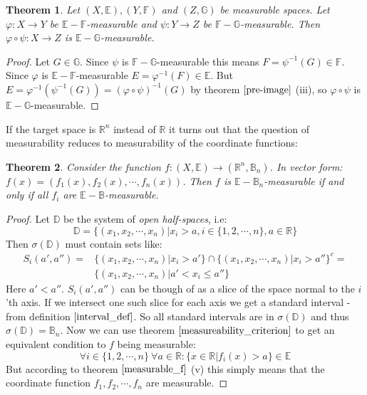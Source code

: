\documentclass[12pt, a4paper]{article}
\newtheorem{theorem}{Theorem}[section]
\numberwithin{equation}{section}
\begin{document}
\begin{theorem}
\label{composite_measurable}
Let $(X,\mathbb{E}), (Y,\mathbb{F})$ and $(Z,\mathbb{G})$ be measurable spaces. Let $\varphi: X\rightarrow Y$ be $\mathbb{E}-\mathbb{F}$-measurable and $\psi: Y\rightarrow Z$ be $\mathbb{F}-\mathbb{G}$-measurable. Then $\varphi\circ\psi: X\rightarrow Z$ is $\mathbb{E}-\mathbb{G}$-measurable.
\end{theorem}
\begin{proof}
Let $G\in\mathbb{G}$. Since $\psi$ is $\mathbb{F}-\mathbb{G}$-measurable this means $F=\psi^{-1}(G)\in\mathbb{F}$. Since $\varphi$ is $\mathbb{E}-\mathbb{F}$-measurable $E=\varphi^{-1}(F)\in\mathbb{E}$. But $E=\varphi^{-1}(\psi^{-1}(G))=(\varphi\circ\psi)^{-1}(G)$ by theorem $\ref{pre-image}$ (iii), so $\varphi\circ\psi$ is $\mathbb{E}-\mathbb{G}$-measurable.
\end{proof}

If the target space is $\mathbb{R}^n$ instead of $\mathbb{R}$ it turns out that the question of measurability reduces to measurability of the coordinate functions:

\begin{theorem}
Consider the function $f: (X,\mathbb{E})\rightarrow(\mathbb{R}^n,\mathbb{B}_n)$. In vector form: $f(x)=(f_1(x), f_2(x),\cdots, f_n(x))$. Then $f$ is $\mathbb{E}-\mathbb{B}_n$-measurable if and only if all $f_i$ are $\mathbb{E}-\mathbb{B}$-measurable.
\end{theorem}
\begin{proof}
Let $\mathbb{D}$ be the system of \textit{open half-spaces}, i.e:
\begin{equation}
\mathbb{D}=\{(x_1,x_2,\cdots,x_n)|x_i>a, i\in\{1,2,\cdots,n\}, a\in\mathbb{R}\}
\end{equation}
Then $\sigma(\mathbb{D})$ must contain sets like:
\begin{align}
S_i(a',a'')=&\{(x_1,x_2,\cdots,x_n)|x_i>a'\}\cap\{(x_1,x_2,\cdots,x_n)|x_i>a''\}^c=\\
&\{(x_1,x_2,\cdots,x_n)|a'<x_i\le a''\}
\end{align}
Here $a'<a''$. $S_i(a',a'')$ can be though of as a slice of the space normal to the $i$'th axis. If we intersect one such slice for each axis we get a standard interval - from definition $\ref{interval_def}$. So all standard intervals are in $\sigma(\mathbb{D})$ and thus $\sigma(\mathbb{D})=\mathbb{B}_n$. Now we can use theorem $\ref{measureability_criterion}$ to get an equivalent condition to $f$ being measurable:
\begin{equation}
\forall i\in\{1, 2,\cdots, n\}\ \forall a\in\mathbb{R}: \{x\in\mathbb{R}|f_i(x)>a\}\in\mathbb{E}
\end{equation}
But according to theorem $\ref{measurable_f}$ (v) this simply means that the coordinate function $f_1,f_2,\cdots,f_n$ are measurable.
\end{proof}
\end{document}

